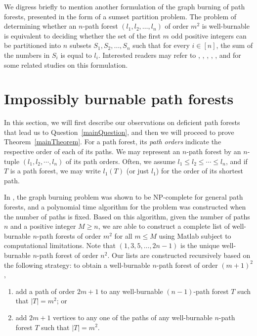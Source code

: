 \documentclass[
final
]{dmtcs-episciences}
\theoremstyle{definition}
\theoremstyle{remark}
\begin{document}
We digress briefly to mention another formulation of the graph burning of path forests, presented in the form of a sumset partition problem.
The problem of determining whether an $n$-path forest $(l_1,l_2,\ldots,l_n)$ of order $m^2$ is well-burnable is equivalent to deciding whether the set of the first $m$ odd positive integers can be partitioned into $n$ subsets $S_1, S_2, \ldots, S_n$ such that for every $i\in [n]$, the sum of the numbers in $S_i$ is equal to $l_i$.
Interested readers may refer to \citet{ando1990disjoint}, \citet{chen2005partition}, \citet{ enomoto1995disjoint}, \citet{fu1994disjoint}, \citet{llado2012modular}, and \citet{ma1994ascending} for some related studies on this formulation.

\section{Impossibly burnable path forests}

In this section, we will first describe our observations on deficient path forests that lead us to Question~\ref{mainQuestion}, and then we will proceed to prove Theorem~\ref{mainTheorem}.
For a path forest, its \emph{path orders} indicate the respective order of each of its paths.
We may represent an $n$-path forest by an $n$-tuple $(l_1,l_2,\cdots,l_n)$ of its path orders.
Often, we assume $l_1\le l_2\le \cdots \le l_n$, and if $T$ is a path forest, we may write $l_1(T)$ (or just $l_1$) for the order of its shortest path.


In \cite{bessy2017burning}, the graph burning problem was shown to be NP-complete for general path forests, and a polynomial time algorithm for the problem was constructed when the number of paths is fixed. Based on this algorithm, given the number of paths $n$ and a positive integer $M\geq n$, we are able to construct  a complete list of well-burnable $n$-path forests of order $m^2$ for all $m\leq M$ using Matlab subject to computational limitations. Note that $(1,3,5, \ldots, 2n-1)$ is  the unique well-burnable $n$-path forest of order $n^2$. Our lists are constructed recursively based on the following strategy: to obtain a well-burnable $n$-path forest of order $(m+1)^2$,
\begin{enumerate}
	\item add a path of order $2m+1$ to any well-burnable $(n-1)$-path forest $T$ such that $\vert T\vert=m^2$; or
	\item add $2m+1$ vertices to any one of the paths of any well-burnable $n$-path forest $T$ such that $\vert T\vert=m^2$.
\end{enumerate}
\end{document}
